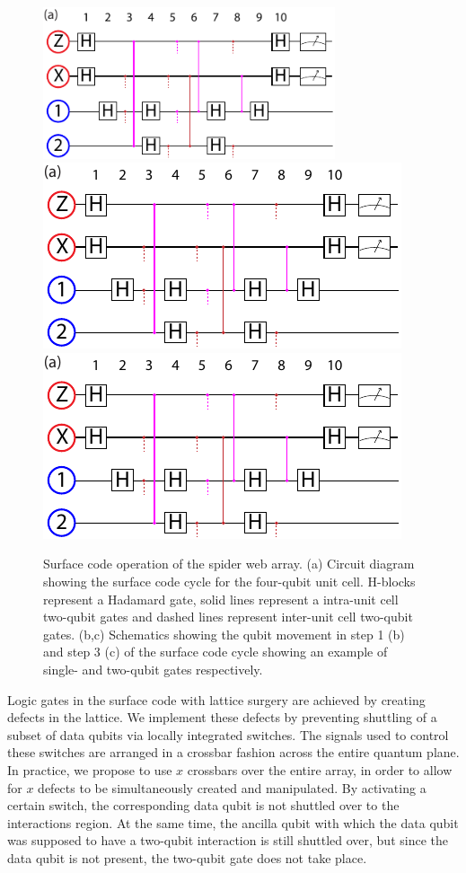 \documentclass[aps,prl,reprint,superscriptaddress,floatfix]{revtex4-1}
\begin{document}
\begin{figure}
    \centering
    \includegraphics[width=86mm,page=1]{Figure_6_surface_code.pdf}\\
    \includegraphics[page=2]{Figure_6_surface_code.pdf}
    \includegraphics[page=4]{Figure_6_surface_code.pdf}
    \caption{Surface code operation of the spider web array. (a) Circuit diagram showing the surface code cycle for the four-qubit unit cell. H-blocks represent a Hadamard gate, solid lines represent a intra-unit cell two-qubit gates and dashed lines represent inter-unit cell two-qubit gates. (b,c) Schematics showing the qubit movement in step 1 (b) and step 3 (c) of the surface code cycle showing an example of single- and two-qubit gates respectively.}
    \label{fig:surface_code}
\end{figure}

Logic gates in the surface code with lattice surgery are achieved by creating defects in the lattice.
We implement these defects by preventing shuttling of a subset of data qubits via locally integrated switches.
The signals used to control these switches are arranged in a crossbar fashion across the entire quantum plane.
In practice, we propose to use $x$ crossbars over the entire array, in order to allow for $x$ defects to be simultaneously created and manipulated.
By activating a certain switch, the corresponding data qubit is not shuttled over to the interactions region.
At the same time, the ancilla qubit with which the data qubit was supposed to have a two-qubit interaction is still shuttled over, but since the data qubit is not present, the two-qubit gate does not take place.
\end{document}
